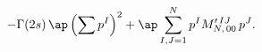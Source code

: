 \begin{equation}
-\Gamma(2s)\,\ap\left(\sum p^I\right)^2
+\ap \sum_{I,J=1}^{N} p^I M^{\prime\,IJ}_{N,\,00}\,p^J.
\end{equation}

